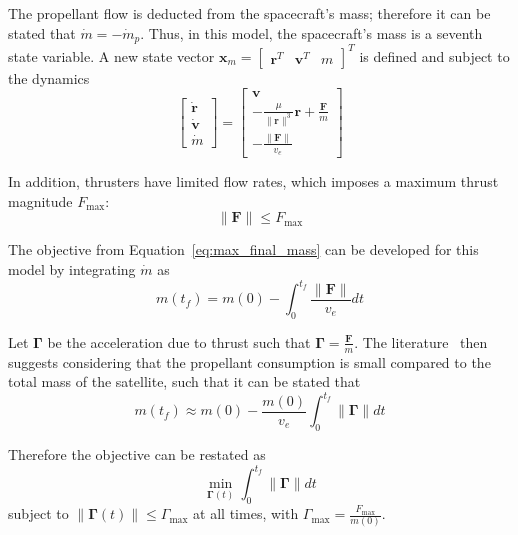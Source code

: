 The propellant flow is deducted from the spacecraft's mass; therefore it can be stated that \(\dot{m} = - \dot{m}_p\). Thus, in this model, the spacecraft's mass is a seventh state variable. A new state vector \(\mathbf{x}_m = \begin{bmatrix}
    \mathbf{r}^T & \mathbf{v}^T & m 
\end{bmatrix}^T\) is defined and subject to the dynamics
\begin{equation}
    \begin{bmatrix}
        \dot{\mathbf{r}} \\ \dot{\mathbf{v}} \\ \dot{m}
    \end{bmatrix} = \begin{bmatrix}
        \mathbf{v} \\ -\frac{\mu}{\lVert \mathbf{r} \rVert^3}\mathbf{r} + \frac{\mathbf{F}}{m} \\ -\frac{\lVert \mathbf{F} \rVert}{v_e}
    \end{bmatrix}
\end{equation}

In addition, thrusters have limited flow rates, which imposes a maximum thrust magnitude \(F_{\max}\):
\begin{equation}
    \lVert \mathbf{F} \rVert \leq F_{\max}
\end{equation}

The objective from Equation~\eqref{eq:max_final_mass} can be developed for this model by integrating \(\dot{m}\) as
\begin{equation}
    m(t_f) = m(0) - \int_0^{t_f} \frac{\lVert \mathbf{F} \rVert}{v_e} dt
\end{equation}

Let \(\mathbf{\Gamma}\) be the acceleration due to thrust such that \(\mathbf{\Gamma} = \frac{\mathbf{F}}{m}\). The literature~\cite{Conway_2010} then suggests considering that the propellant consumption is small compared to the total mass of the satellite, such that it can be stated that
\begin{equation}
    m(t_f) \approx m(0) - \frac{m(0)}{v_e}\int_0^{t_f} \lVert \mathbf{\Gamma} \rVert dt
\end{equation}

Therefore the objective can be restated as
\begin{equation}\label{eq:obj_continuous_thrust}
    \min_{\mathbf{\Gamma}(t)} \int_0^{t_f} \lVert \mathbf{\Gamma} \rVert dt
\end{equation}
subject to \(\lVert \mathbf{\Gamma}(t) \rVert \leq \Gamma_{\max}\) at all times, with \(\Gamma_{\max} = \frac{F_{\max}}{m(0)}\).

